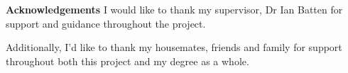 {\huge\textbf{Acknowledgements}}
\vspace{0.7cm}
\newline
I would like to thank my supervisor, Dr Ian Batten for support and guidance throughout the project.
\par
Additionally, I'd like to thank my housemates, friends and family for support throughout both this project and my degree as a whole.
